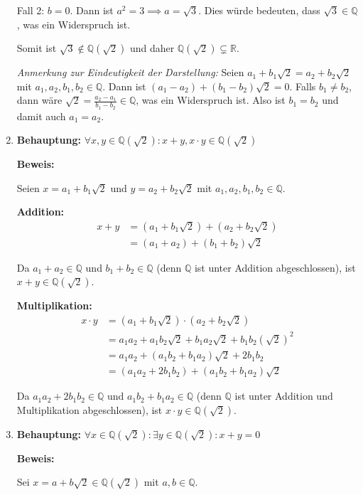 \documentclass{article}
\newcommand{\Q}{\mathbb{Q}}
\newcommand{\R}{\mathbb{R}}
\newcommand{\adjunction}[2]{#1(#2)}
\newcommand{\fa}[1]{\forall #1 \colon}
\newcommand{\ex}[1]{\exists #1 \colon}
\begin{document}
\begin{enumerate}
Fall 2: \(b = 0\). Dann ist \(a^2 = 3 \implies a = \sqrt{3}\).
Dies würde bedeuten, dass \(\sqrt{3} \in \Q\), was ein Widerspruch ist.

Somit ist \(\sqrt{3} \notin \adjunction{\Q}{\sqrt 2}\) und daher \(\adjunction{\Q}{\sqrt 2} \subsetneq \R\).

\textit{Anmerkung zur Eindeutigkeit der Darstellung:} Seien \(a_1 + b_1\sqrt{2} = a_2 + b_2\sqrt{2}\) mit \(a_1, a_2, b_1, b_2 \in \Q\).
Dann ist \((a_1 - a_2) + (b_1 - b_2)\sqrt{2} = 0\).
Falls \(b_1 \neq b_2\), dann wäre \(\sqrt{2} = \frac{a_2 - a_1}{b_1 - b_2} \in \Q\), was ein Widerspruch ist.
Also ist \(b_1 = b_2\) und damit auch \(a_1 = a_2\).

\item \textbf{Behauptung:} \( \fa{x,y \in \adjunction{\Q}{\sqrt 2}} x + y, x \cdot y \in \adjunction{\Q}{\sqrt 2}\)

\textbf{Beweis:}

Seien \(x = a_1 + b_1\sqrt{2}\) und \(y = a_2 + b_2\sqrt{2}\) mit \(a_1, a_2, b_1, b_2 \in \Q\).

\textbf{Addition:}
\begin{align}
x + y &= (a_1 + b_1\sqrt{2}) + (a_2 + b_2\sqrt{2})\\
&= (a_1 + a_2) + (b_1 + b_2)\sqrt{2}
\end{align}

Da \(a_1 + a_2 \in \Q\) und \(b_1 + b_2 \in \Q\) (denn \(\Q\) ist unter Addition abgeschlossen), 
ist \(x + y \in \adjunction{\Q}{\sqrt 2}\).

\textbf{Multiplikation:}
\begin{align}
x \cdot y &= (a_1 + b_1\sqrt{2}) \cdot (a_2 + b_2\sqrt{2})\\
&= a_1a_2 + a_1b_2\sqrt{2} + b_1a_2\sqrt{2} + b_1b_2(\sqrt{2})^2\\
&= a_1a_2 + (a_1b_2 + b_1a_2)\sqrt{2} + 2b_1b_2\\
&= (a_1a_2 + 2b_1b_2) + (a_1b_2 + b_1a_2)\sqrt{2}
\end{align}

Da \(a_1a_2 + 2b_1b_2 \in \Q\) und \(a_1b_2 + b_1a_2 \in \Q\) (denn \(\Q\) ist unter Addition und Multiplikation abgeschlossen),
ist \(x \cdot y \in \adjunction{\Q}{\sqrt 2}\).

\item \textbf{Behauptung:} \( \fa{x \in \adjunction{\Q}{\sqrt{2}}} \ex{y \in \adjunction{\Q}{\sqrt{2}}} x + y = 0\)

\textbf{Beweis:}

Sei \(x = a + b\sqrt{2} \in \adjunction{\Q}{\sqrt{2}}\) mit \(a, b \in \Q\).


\end{enumerate}
\end{document}
